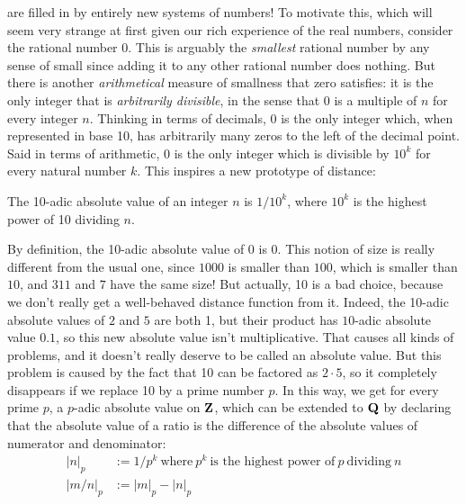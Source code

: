 \documentclass[11pt,oneside]{amsart}
\begin{document}
 are filled in by entirely new systems of numbers!
To motivate this, which will seem very strange at first given our rich experience of the real numbers, consider the rational
number 0.  This is arguably the {\em smallest} rational number by any sense of small since adding it to any other rational number
does nothing.  But there is another {\em arithmetical} measure of smallness that zero satisfies: it is the only integer
that is {\em arbitrarily divisible}, in the sense that $0$ is a multiple of $n$ for every integer $n$.  Thinking in terms of 
decimals, $0$ is the only integer which, when represented in base 10, has arbitrarily many zeros to the left of the decimal point.
Said in terms of arithmetic, 0 is the only integer which is divisible by $10^k$ for every natural number $k$.
This inspires a new prototype of distance:

\begin{definition}
	The 10-adic absolute value of an integer $n$ is $1/10^k$, where $10^k$ is the highest power of
	10 dividing $n$.
\end{definition}  

By definition, the 10-adic absolute value of $0$ is 0.  This notion of size 
is really different from the usual one, since $1000$ is smaller than $100$, which is smaller than $10$,
and $311$ and $7$ have the same size!  But actually, 10 is a bad choice, because we don't really get a well-behaved
distance function from it.  Indeed, the 10-adic absolute values of $2$ and $5$ are both 1, but their product has 
$10$-adic absolute value $0.1$, so this new absolute value isn't multiplicative.  That causes all kinds of problems,
and it doesn't really deserve to be called an absolute value.  But this problem is caused by the fact that 10 can be factored as $2\cdot 5$,
so it completely disappears if we replace 10 by a prime number $p$.  In this way, we get for every prime $p$,
a $p$-adic absolute value on $\mathbf{Z}$, which can be extended to $\mathbf{Q}$ by declaring that the absolute value of
a ratio is the difference of the absolute values of numerator and denominator:
\begin{align*}
	|n|_p &:= 1/p^k\ \text{where}\ p^k\ \text{is the highest power of}\ p\ \text{dividing}\ n \\
	|m/n|_p &:= |m|_p - |n|_p
\end{align*}
\end{document}
